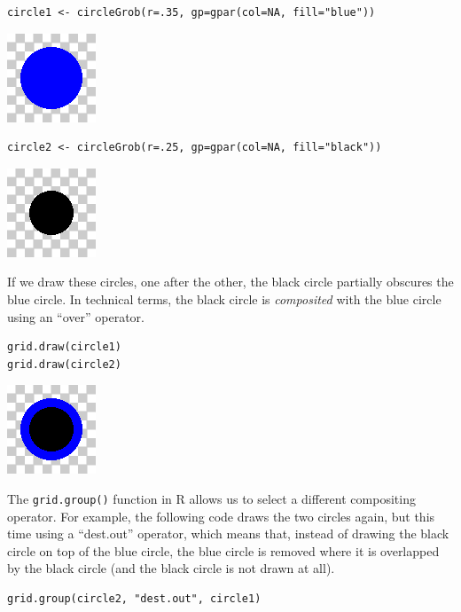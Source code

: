 \begin{verbatim}
circle1 <- circleGrob(r=.35, gp=gpar(col=NA, fill="blue"))
\end{verbatim}

\includegraphics{murrell-definitions-2023_files/figure-latex/unnamed-chunk-27-1.png}

\begin{verbatim}
circle2 <- circleGrob(r=.25, gp=gpar(col=NA, fill="black"))
\end{verbatim}

\includegraphics{murrell-definitions-2023_files/figure-latex/unnamed-chunk-28-1.png}

If we draw these circles, one after the other, the black circle
partially obscures the blue circle.
In technical terms, the black circle is \emph{composited} with the
blue circle using an ``over'' operator.

\begin{verbatim}
grid.draw(circle1)
grid.draw(circle2)
\end{verbatim}

\includegraphics{murrell-definitions-2023_files/figure-latex/unnamed-chunk-29-1.png}

The \texttt{grid.group()} function in R allows us to select a different
compositing operator. For example, the following code
draws the two circles again, but this time using a ``dest.out''
operator, which means that, instead of drawing the black circle
on top of the blue circle, the blue circle is removed where it
is overlapped by the black circle (and the black circle is not
drawn at all).

\begin{verbatim}
grid.group(circle2, "dest.out", circle1)
\end{verbatim}

